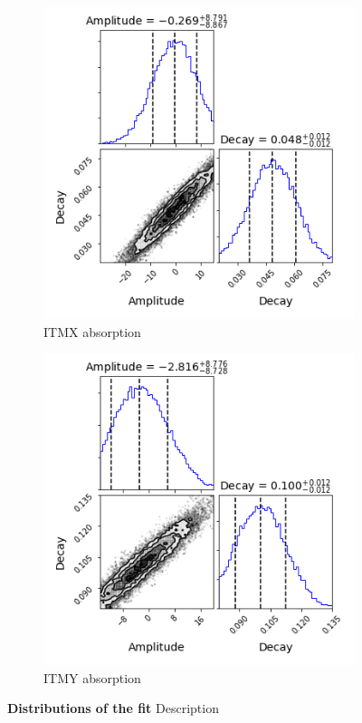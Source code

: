 \begin{figure}[ht]
	\centering
	\begin{subfigure}[a]{0.5\textwidth}
		\includegraphics[width=\textwidth]{../Figures/MCMC_ITMX_abs.png}
		\caption{ITMX absorption}
		\label{fig:mcmc_itmx_abs}
	\end{subfigure}
	\hfill
	\begin{subfigure}[b]{0.5\textwidth}
		\includegraphics[width=\textwidth]{../Figures/MCMC_ITMY_abs.png}
		\caption{ITMY absorption}
		\label{fig:mcmc_itmy_abs}
	\end{subfigure}
	\caption[Distributions of the fit]  
	{\textbf{Distributions of the fit} Description}
	\label{fig:mcmc_hws_abs}
\end{figure}


